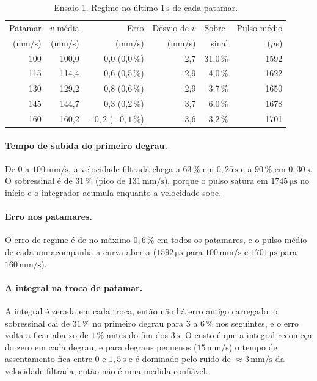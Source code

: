 \documentclass[11pt,a4paper]{article}
\newcommand{\unid}[1]{\,\mathrm{#1}}
\begin{document}
\begin{table}[htbp]
\centering
\caption{Ensaio 1. Regime no último $1\unid{s}$ de cada patamar.}
\label{tab:e1}
\small\setlength{\tabcolsep}{4pt}
\begin{tabular}{rrrrrr}
\toprule
Patamar & $v$ média & Erro & Desvio de $v$ & Sobre- & Pulso médio \\
(mm/s) & (mm/s) & (mm/s) & (mm/s) & sinal & ($\mu$s) \\
\midrule
100 & 100,0 & 0,0 (0,0\,\%) & 2,7 & 31,0\,\% & 1592 \\
115 & 114,4 & 0,6 (0,5\,\%) & 2,9 & 4,0\,\%  & 1622 \\
130 & 129,2 & 0,8 (0,6\,\%) & 2,9 & 3,7\,\%  & 1650 \\
145 & 144,7 & 0,3 (0,2\,\%) & 3,7 & 6,0\,\%  & 1678 \\
160 & 160,2 & $-0{,}2$ ($-0{,}1\,\%$) & 3,6 & 3,2\,\% & 1701 \\
\bottomrule
\end{tabular}
\end{table}

\paragraph{Tempo de subida do primeiro degrau.} De $0$ a $100\unid{mm/s}$, a velocidade filtrada chega a $63\,\%$ em $0{,}25\unid{s}$ e a $90\,\%$ em $0{,}30\unid{s}$. O sobressinal é de $31\,\%$ (pico de $131\unid{mm/s}$), porque o pulso satura em $1745\unid{\mu s}$ no início e o integrador acumula enquanto a velocidade sobe.

\paragraph{Erro nos patamares.} O erro de regime é de no máximo $0{,}6\,\%$ em todos os patamares, e o pulso médio de cada um acompanha a curva aberta ($1592\unid{\mu s}$ para $100\unid{mm/s}$ e $1701\unid{\mu s}$ para $160\unid{mm/s}$).

\paragraph{A integral na troca de patamar.} A integral é zerada em cada troca, então não há erro antigo carregado: o sobressinal cai de $31\,\%$ no primeiro degrau para $3$ a $6\,\%$ nos seguintes, e o erro volta a ficar abaixo de $1\,\%$ antes do fim dos $3\unid{s}$. O custo é que a integral recomeça do zero em cada degrau, e para degraus pequenos ($15\unid{mm/s}$) o tempo de assentamento fica entre $0$ e $1{,}5\unid{s}$ e é dominado pelo ruído de $\approx 3\unid{mm/s}$ da velocidade filtrada, então não é uma medida confiável.
\end{document}

